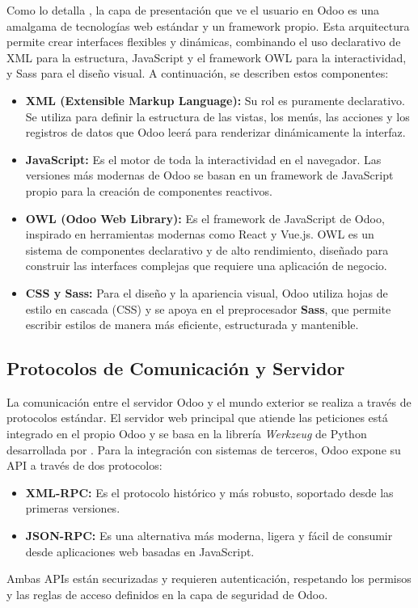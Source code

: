 \documentclass[12pt,letterpaper,spanish]{report}
\begin{document}
Como lo detalla \cite{TortCarrillo2024}, la capa de presentación que ve el usuario en Odoo es una amalgama de tecnologías web estándar y un framework propio. Esta arquitectura permite crear interfaces flexibles y dinámicas, combinando el uso declarativo de XML para la estructura, JavaScript y el framework OWL para la interactividad, y Sass para el diseño visual. A continuación, se describen estos componentes:

\begin{itemize}
    \item \textbf{XML (Extensible Markup Language):} Su rol es puramente declarativo. Se utiliza para definir la estructura de las vistas, los menús, las acciones y los registros de datos que Odoo leerá para renderizar dinámicamente la interfaz.

    \item \textbf{JavaScript:} Es el motor de toda la interactividad en el navegador. Las versiones más modernas de Odoo se basan en un framework de JavaScript propio para la creación de componentes reactivos.

    \item \textbf{OWL (Odoo Web Library):} Es el framework de JavaScript de Odoo, inspirado en herramientas modernas como React y Vue.js. OWL es un sistema de componentes declarativo y de alto rendimiento, diseñado para construir las interfaces complejas que requiere una aplicación de negocio.

    \item \textbf{CSS y Sass:} Para el diseño y la apariencia visual, Odoo utiliza hojas de estilo en cascada (CSS) y se apoya en el preprocesador \textbf{Sass}, que permite escribir estilos de manera más eficiente, estructurada y mantenible.
\end{itemize}

\subsection{Protocolos de Comunicación y Servidor}
La comunicación entre el servidor Odoo y el mundo exterior se realiza a través de protocolos estándar. El servidor web principal que atiende las peticiones está integrado en el propio Odoo y se basa en la librería \textit{Werkzeug} de Python desarrollada por \cite{werkzeugDocs}. Para la integración con sistemas de terceros, Odoo expone su API a través de dos protocolos:

\begin{itemize}
    \item \textbf{XML-RPC:} Es el protocolo histórico y más robusto, soportado desde las primeras versiones.
    \item \textbf{JSON-RPC:} Es una alternativa más moderna, ligera y fácil de consumir desde aplicaciones web basadas en JavaScript.
\end{itemize}
Ambas APIs están securizadas y requieren autenticación, respetando los permisos y las reglas de acceso definidos en la capa de seguridad de Odoo.
\end{document}
